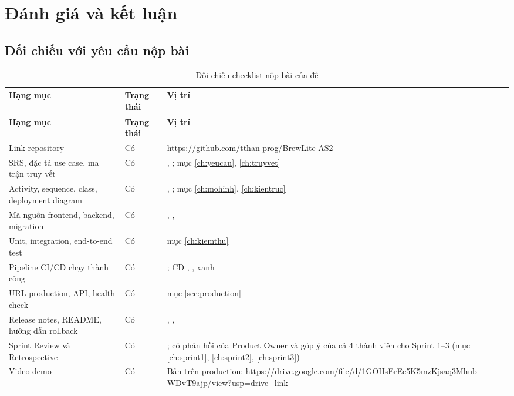 \section{Đánh giá và kết luận}\label{ch:ketluan}

\subsection{Đối chiếu với yêu cầu nộp bài}
\begin{longtable}{@{}L{5.6cm}L{1.6cm}L{6.6cm}@{}}
\caption{Đối chiếu checklist nộp bài của đề}\label{tab:checklist}\\
\toprule
\textbf{Hạng mục} & \textbf{Trạng thái} & \textbf{Vị trí} \\ \midrule \endfirsthead
\toprule \textbf{Hạng mục} & \textbf{Trạng thái} & \textbf{Vị trí} \\ \midrule \endhead
\bottomrule \endfoot
Link repository & Có & \url{https://github.com/tthan-prog/BrewLite-AS2} \\
SRS, đặc tả use case, ma trận truy vết & Có & , ; mục \ref{ch:yeucau}, \ref{ch:truyvet} \\
Activity, sequence, class, deployment diagram & Có & , ; mục \ref{ch:mohinh}, \ref{ch:kientruc} \\
Mã nguồn frontend, backend, migration & Có & , ,  \\
Unit, integration, end-to-end test & Có & mục \ref{ch:kiemthu} \\
Pipeline CI/CD chạy thành công & Có & ; CD , ,  xanh \\
URL production, API, health check & Có & mục \ref{sec:production} \\
Release notes, README, hướng dẫn rollback & Có & , ,  \\
Sprint Review và Retrospective & Có & ; có phản hồi của Product Owner và góp ý của cả 4 thành viên cho Sprint 1--3 (mục \ref{ch:sprint1}, \ref{ch:sprint2}, \ref{ch:sprint3}) \\
Video demo & Có & Bản  trên production: \url{https://drive.google.com/file/d/1GOHsErEc5K5mzKjsaq3Mhub-WDvT9ajp/view?usp=drive_link} \\
\end{longtable}

